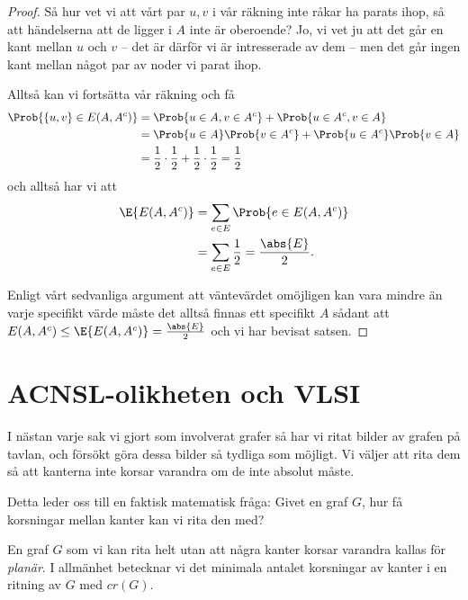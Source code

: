 \documentclass[nobib]{tufte-handout}
\begin{document}
\begin{proposition}
\begin{proof}
    Så hur vet vi att vårt par $u, v$ i vår räkning inte råkar ha parats ihop, så att händelserna att de ligger i $A$ inte är oberoende? Jo, vi vet ju att det går en kant mellan $u$ och $v$ -- det är därför vi är intresserade av dem -- men det går ingen kant mellan något par av noder vi parat ihop.

    Alltså kan vi fortsätta vår räkning och få
    \begin{align*}
      \Prob{\{u,v\} \in E(A, A^c)} &= \Prob{u \in A, v \in A^c} + \Prob{u \in A^c, v \in A}\\
      &= \Prob{u \in A}\Prob{v \in A^c} + \Prob{u \in A^c}\Prob{v \in A}\\
      &= \frac{1}{2}\cdot\frac{1}{2} + \frac{1}{2}\cdot\frac{1}{2} = \frac{1}{2}
    \end{align*}
    och alltså har vi att
    \begin{align*}
      \E{E(A,A^c)} &= \sum_{e \in E} \Prob{e \in E(A, A^c)}\\
      &= \sum_{e \in E} \frac{1}{2} = \frac{\abs{E}}{2}.
    \end{align*}

    Enligt vårt sedvanliga argument att väntevärdet omöjligen kan vara mindre än varje specifikt värde måste det alltså finnas ett specifikt $A$ sådant att $E(A, A^c) \leq \E{E(A,A^c)} = \frac{\abs{E}}{2}$ och vi har bevisat satsen.
  \end{proof}
\end{proposition}

\section{ACNSL-olikheten och VLSI}

I nästan varje sak vi gjort som involverat grafer så har vi ritat bilder av grafen på tavlan, och försökt göra dessa bilder så tydliga som möjligt. Vi väljer att rita dem så att kanterna inte korsar varandra om de inte absolut måste.

Detta leder oss till en faktisk matematisk fråga: Givet en graf $G$, hur få korsningar mellan kanter kan vi rita den med?

\begin{definition}
  En graf $G$ som vi kan rita helt utan att några kanter korsar varandra kallas för \emph{planär}. I allmänhet betecknar vi det minimala antalet korsningar av kanter i en ritning av $G$ med $cr(G)$.
\end{definition}
\end{document}
